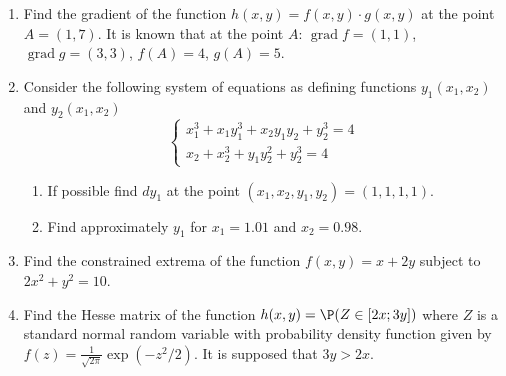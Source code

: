 \documentclass[12pt]{article} %
\theoremstyle{definition} %
\DeclareMathOperator{\grad}{grad}
\providecommand{\grad}{\mathrm{grad}\,}
\begin{document}
\begin{enumerate}
\item Find the gradient of the function $h(x,y)=f(x,y)\cdot g(x,y)$ at the point $A=(1,7)$. It is known that at the point $A$: $\grad f=(1,1)$, $\grad g=(3,3)$, $f(A)=4$, $g(A)=5$.

\item Consider the following system of equations as defining functions $y_1(x_1,x_2)$ and $y_2(x_1,x_2)$
\[
\left\{
\begin{array}{c}
x_1^3+x_1 y_1^3+x_2 y_1 y_2+y_2^3=4 \\
x_2+x_2^3+y_1 y_2^2+y_2^3=4
\end{array}
\right.
\]
\begin{enumerate}
\item If possible find $dy_1$ at the point $(x_1,x_2,y_1,y_2)=(1,1,1,1)$.
\item Find approximately $y_1$ for $x_1=1.01$ and $x_2=0.98$.
\end{enumerate}
\item Find the constrained extrema of the function $f(x,y)=x+2y$ subject to $2x^2+y^2=10$.

\item Find the Hesse matrix of the function $h(x,y)=\P( Z \in [2x;3y])$ where $Z$ is a standard normal random variable with probability density function given by $f(z)=\frac{1}{\sqrt{2\pi}}\exp(-z^2/2)$. It is supposed that $3y>2x$.

\end{enumerate}
\end{document}
